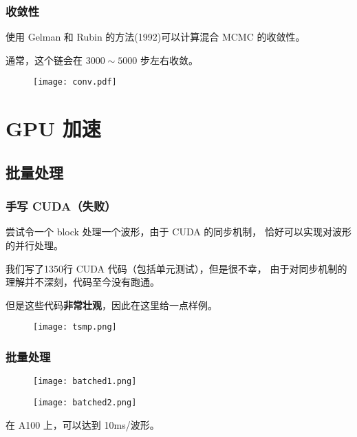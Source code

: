 \documentclass[aspectratio=169]{beamer}
\begin{document}
\begin{frame}
    \frametitle{收敛性}

    使用 Gelman 和 Rubin 的方法(1992)可以计算混合 MCMC 的收敛性。

    通常，这个链会在 $3000\sim 5000$ 步左右收敛。

    \begin{figure}
        \centering
        \texttt{[image: conv.pdf]}
    \end{figure}

\end{frame}
\section{GPU 加速}
\subsection{批量处理}
\begin{frame}
    \frametitle{手写 CUDA（失败）}

    \begin{multicols}{2}
        尝试令一个 block 处理一个波形，由于 CUDA 的同步机制，
        恰好可以实现对波形的并行处理。

        我们写了1350行 CUDA 代码（包括单元测试），但是很不幸，
        由于对同步机制的理解并不深刻，代码至今没有跑通。

        但是这些代码\textbf{非常壮观}，因此在这里给一点样例。
        \columnbreak
        \begin{figure}
            \texttt{[image: tsmp.png]}
        \end{figure}
    \end{multicols}

\end{frame}

\begin{frame}[allowframebreaks]
    \frametitle{批量处理}

    \begin{figure}
        \centering
        \texttt{[image: batched1.png]}
    \end{figure}

    \begin{figure}
        \centering
        \texttt{[image: batched2.png]}
    \end{figure}

    在 A100 上，可以达到 10ms/波形。

\end{frame}
\end{document}
